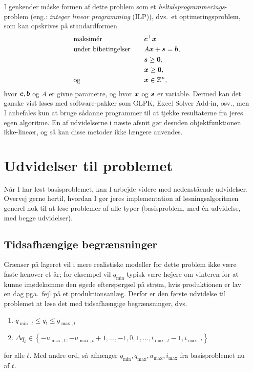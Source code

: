 \documentclass[12pt,a4paper,oneside,final]{article}
\begin{document}
I genkender måske formen af dette problem som et \emph{heltalsprogrammerings}-problem (eng.: \emph{integer linear programming} (ILP)), dvs.\ et optimeringsproblem, som kan opskrives på standardformen
\begin{alignat*}{2}
 & \text{maksimér}            &\quad  & \bm{c}^{\top} \bm{x}  \\
 & \text{under bibetingelser} &\quad  & A \bm{x} + \bm{s} = \bm{b} , \\
 &                            &\quad  & \bm{s} \geq \bm{0} , \\
 &                            &\quad  & \bm{x} \geq \bm{0} , \\
 & \text{og}                  &\quad  & \bm{x} \in \mathbb{Z}^{n} ,
\end{alignat*}
hvor \(\bm{c},\bm{b}\) og \(A\) er givne parametre, og hvor \(\bm{x}\) og \(\bm{s}\) er variable.
Dermed kan det ganske vist løses med software-pakker som GLPK, Excel Solver Add-in, osv., men I anbefales kun at bruge sådanne programmer til at tjekke resultaterne fra jeres egen algoritme.
En af udvidelserne i næste afsnit gør desuden objektfunktionen ikke-lineær, og så kan disse metoder ikke længere anvendes.


\clearpage
\section{Udvidelser til problemet}
Når I har løst basisproblemet, kan I arbejde videre med nedenstående udvidelser.
Overvej gerne hertil, hvordan I gør jeres implementation af løsningsalgoritmen generel nok til at løse problemer af alle typer (basisproblem, med én udvidelse, med begge udvidelser).

\subsection{Tidsafhængige begrænsninger}
Grænser på lageret vil i mere realistiske modeller for dette problem ikke være faste henover et år;
for eksempel vil \(q_{\min}\) typisk være højere om vinteren for at kunne imødekomme den øgede efterspørgsel på strøm, hvis produktionen er lav en dag pga.\ fejl på et produktionsanlæg.
Derfor er den første udvidelse til problemet at løse det med tidsafhængige begrænsninger, dvs.\
\begin{enumerate}
\item \(q_{\min,t} \leq q_{t} \leq q_{\max,t}\)
\item \(\Delta q_{t} \in
    \left\{
    -u_{\max,t} , -u_{\max,t}+1 , \dotsc, -1, 0, 1, \dotsc, i_{\max,t} - 1 , i_{\max,t}
    \right\}\)
\end{enumerate}
for alle \(t\).
Med andre ord, så afhænger \(q_{\min}, q_{\max}, u_{\max}, i_{\max}\) fra basisproblemet nu af \(t\).
\end{document}
